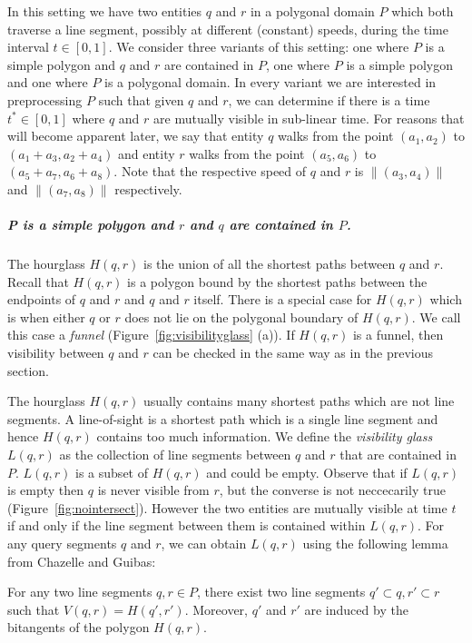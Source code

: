 \documentclass[a4paper, UKenglish]{lipics-v2018}
\begin{document}
In this setting we have two entities $q$ and $r$ in a polygonal domain $P$ which both traverse a line segment, possibly at different (constant) speeds, during the time interval $t \in [0,1]$. We consider three variants of this setting: one where $P$ is a simple polygon and $q$ and $r$ are contained in $P$, one where $P$ is a simple polygon and one where $P$ is a polygonal domain. In every variant we are interested in preprocessing $P$ such that given $q$ and $r$, we can determine if there is a time $t^* \in [0,1]$ where $q$ and $r$ are mutually visible in sub-linear time. For reasons that will become apparent later, we say that entity $q$ walks from the point $(a_1, a_2)$ to $(a_1 + a_3, a_2 + a_4)$ and entity $r$ walks from the point $(a_5, a_6)$ to $(a_5 + a_7, a_6 + a_8)$. Note that the respective speed of $q$ and $r$ is $\lVert (a_3, a_4) \rVert$ and $\lVert (a_7, a_8) \rVert$ respectively.

\subparagraph{P is a simple polygon and $r$ and $q$ are contained in $P$.}
The hourglass $H(q, r)$ is the union of all the shortest paths between $q$ and $r$. 
Recall that $H(q,r)$ is a polygon bound by the shortest paths between the endpoints of $q$ and $r$ and $q$ and $r$ itself. There is a special case for $H(q,r)$ which is when either $q$ or $r$ does not lie on the polygonal boundary of $H(q,r)$. We call this case a \emph{funnel} (Figure~\ref{fig:visibilityglass} (a)). If $H(q,r)$ is a funnel, then visibility between $q$ and $r$ can be checked in the same way as in the previous section.

The hourglass $H(q, r)$ usually contains many shortest paths which are not line segments. A line-of-sight is a shortest path which is a single line segment and hence $H(q,r)$ contains too much information. We define the \emph{visibility glass} $L(q,r)$ as the collection of line segments between $q$ and $r$ that are contained in $P$. $L(q,r)$ is a subset of $H(q,r)$ and could be empty. Observe that if $L(q,r)$ is empty then $q$ is never visible from $r$, but the converse is not neccecarily true (Figure~\ref{fig:nointersect}). However the two entities are mutually visible at time $t$ if and only if the line segment between them is contained within $L(q,r)$. For any query segments $q$ and $r$, we can obtain $L(q,r)$ using the following lemma from Chazelle and Guibas:

\begin{lemma}
For any two line segments $q, r \in P$, there exist two line segments $q' \subset q, r' \subset r$ such that $V(q, r) = H(q', r')$. Moreover, $q'$ and $r'$ are induced by the bitangents of the polygon $H(q, r)$.
\end{lemma}
\end{document}
